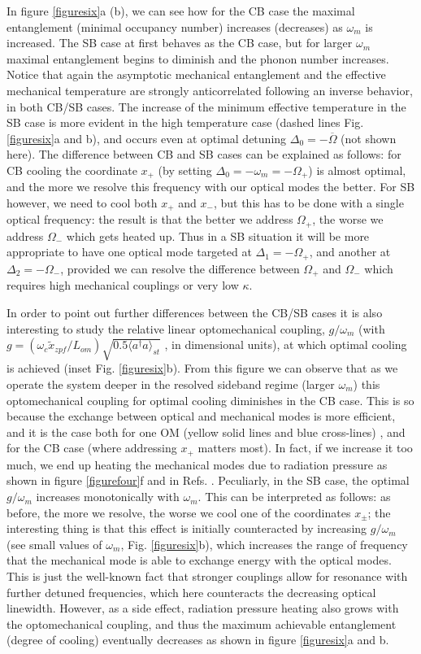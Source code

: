 \documentclass[a4paper]{jpconf}
\begin{document}
In figure \ref{figuresix}a (b), we can see how for the CB case the maximal entanglement (minimal occupancy number) increases (decreases) 
as $\omega_m$ is increased.  The SB case at first behaves as the CB case, but for larger $\omega_m$  maximal 
entanglement begins to diminish and the phonon number increases.  Notice that again the asymptotic mechanical entanglement and the
effective mechanical temperature are strongly anticorrelated
following an inverse behavior, in both CB/SB cases. The increase of the minimum effective temperature in the SB case is 
more evident in the high temperature case (dashed lines Fig. \ref{figuresix}a and b), and occurs even at optimal detuning $\Delta_0=-\overline{\Omega}$ (not shown here).
The difference between CB and SB cases can be explained as follows: for CB cooling the coordinate $x_+$ (by 
setting $\Delta_0=-\omega_m=-\Omega_+$) is almost optimal, and the more we resolve this frequency
with our optical modes the better. For SB however, we need to cool both $x_+$ and $x_-$,
but this has to be done with a single optical frequency: the result is that the better
we address $\Omega_+$, the worse we address $\Omega_-$ which gets heated up. Thus in a SB situation
it will be more appropriate to have one optical mode targeted at $\Delta_1=-\Omega_+$,
and another at $\Delta_2=-\Omega_-$, provided we can resolve the difference between $\Omega_+$ and
$\Omega_-$ which requires high mechanical couplings or very low $\kappa$.

 In order to point out further differences between the CB/SB cases it is also interesting to study the relative linear 
optomechanical coupling, {  $g/\omega_m$ (with $g=(\omega_c\tilde{x}_{zpf}/L_{om})\sqrt{0.5\langle{a^\dagger a}\rangle_{st}}$ \cite{1}, in
dimensional units)}, at which
optimal cooling is achieved (inset Fig. \ref{figuresix}b). From this figure we can observe that as we operate the system deeper in the resolved sideband 
regime (larger $\omega_m$) this optomechanical coupling
for optimal cooling diminishes in the CB case. This is so because the exchange between optical and mechanical modes
is more efficient, and it is the case both for one OM (yellow solid lines and blue cross-lines) \cite{56}, and for the CB case (where addressing $x_+$
matters most). In fact, if we increase it too much, we end up heating the mechanical modes due to
radiation pressure as shown in figure \ref{figurefour}f and in Refs. \cite{16,56}. Peculiarly, in the SB case, 
the optimal $g/\omega_m$ increases monotonically with $\omega_m$. This can be interpreted as follows: as before, 
the more we resolve, the worse we cool one of the coordinates $x_\pm$; the interesting thing is that this effect   is initially  
counteracted by increasing $g/\omega_m$ (see small values of $\omega_m$, Fig. \ref{figuresix}b), which increases the range of frequency that the mechanical mode is able to exchange 
energy with the optical modes. This is just the well-known fact that stronger couplings allow for resonance with further
detuned frequencies, which here counteracts the decreasing optical linewidth. However, as a side effect, 
radiation pressure heating also grows with the optomechanical coupling, and thus the maximum achievable entanglement (degree of cooling)
eventually decreases as shown in figure \ref{figuresix}a and b. 
\end{document}
